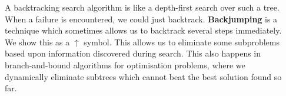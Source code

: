 \documentclass[a0paper]{tikzposter}
\begin{document}
\begin{columns}
{\begin{center}
    \end{center}

    \vspace{0.5cm}

    A backtracking search algorithm is like a depth-first search over such a tree.  When a failure
    is encountered, we could just backtrack. \textbf{Backjumping} is a technique which sometimes
    allows us to backtrack several steps immediately. We show this as a $\uparrow$ symbol. This
    allows us to eliminate some subproblems based upon information discovered during search. This
    also happens in branch-and-bound algorithms for optimisation problems, where we dynamically
    eliminate subtrees which cannot beat the best solution found so far.
}


\end{columns}
\end{document}
